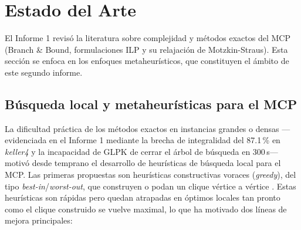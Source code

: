 \section{Estado del Arte}\label{sec:eda2}

El Informe 1 revisó la literatura sobre complejidad y métodos exactos del MCP (Branch \& Bound, formulaciones ILP y su relajación de Motzkin-Straus). Esta sección se enfoca en los enfoques metaheurísticos, que constituyen el ámbito de este segundo informe.

\subsection{Búsqueda local y metaheurísticas para el MCP}

La dificultad práctica de los métodos exactos en instancias grandes o densas —evidenciada en el Informe 1 mediante la brecha de integralidad del 87.1\,\% en \textit{keller4} y la incapacidad de GLPK de cerrar el árbol de búsqueda en 300\,s— motivó desde temprano el desarrollo de heurísticas de búsqueda local para el MCP. Las primeras propuestas son heurísticas constructivas voraces (\textit{greedy}), del tipo \textit{best-in}/\textit{worst-out}, que construyen o podan un clique vértice a vértice \parencite{pardalos1994maximum}. Estas heurísticas son rápidas pero quedan atrapadas en óptimos locales tan pronto como el clique construido se vuelve maximal, lo que ha motivado dos líneas de mejora principales:


